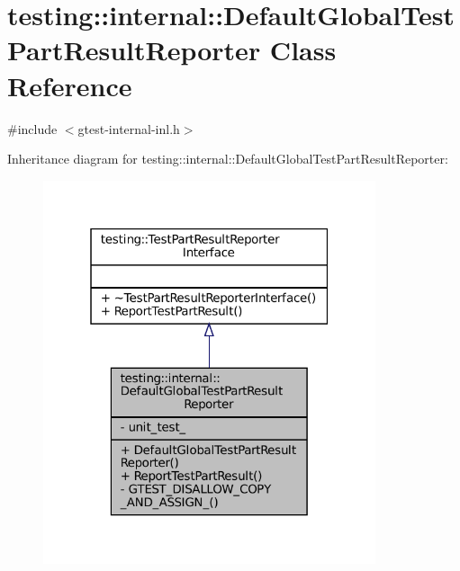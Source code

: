 \hypertarget{classtesting_1_1internal_1_1DefaultGlobalTestPartResultReporter}{}\section{testing\+:\+:internal\+:\+:Default\+Global\+Test\+Part\+Result\+Reporter Class Reference}
\label{classtesting_1_1internal_1_1DefaultGlobalTestPartResultReporter}


{\ttfamily \#include $<$gtest-\/internal-\/inl.\+h$>$}



Inheritance diagram for testing\+:\+:internal\+:\+:Default\+Global\+Test\+Part\+Result\+Reporter\+:
\nopagebreak
\begin{figure}[H]
\begin{center}
\leavevmode
\includegraphics[width=277pt]{classtesting_1_1internal_1_1DefaultGlobalTestPartResultReporter__inherit__graph}
\end{center}
\end{figure}


